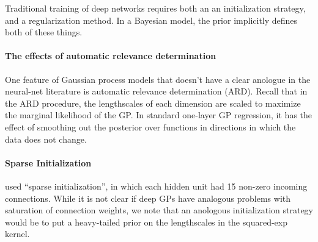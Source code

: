 \documentclass{article}
\begin{document}
Traditional training of deep networks requires both an an initialization strategy, and a regularization method.  In a Bayesian model, the prior implicitly defines both of these things.

%


\paragraph{The effects of automatic relevance determination}  One feature of Gaussian process models that doesn't have a clear anologue in the neural-net literature is automatic relevance determination (ARD).  Recall that in the ARD procedure, the lengthscales of each dimension are scaled to maximize the marginal likelihood of the GP.  In standard one-layer GP regression, it has the effect of smoothing out the posterior over functions in directions in which the data does not change.

\paragraph{Sparse Initialization}
\cite{martens2010deep} used “sparse initialization”, in which each hidden unit had 15 non-zero incoming connections.  %
%
While it is not clear if deep GPs have analogous problems with saturation of connection weights, we note that an anologous initialization strategy would be to put a heavy-tailed prior on the lengthscales in the squared-exp kernel.
\end{document}
